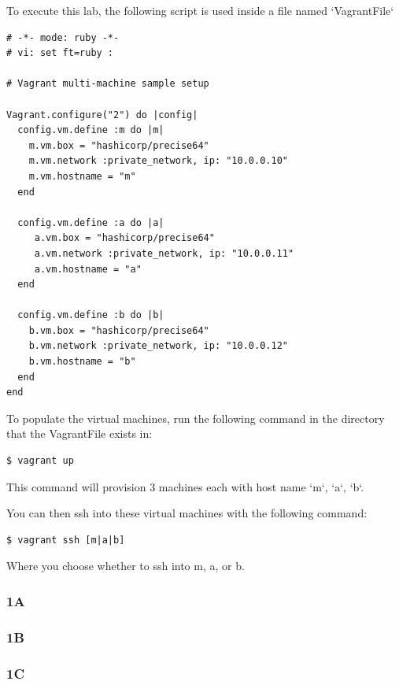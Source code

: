 \documentclass[12pt]{article}
\begin{document}
To execute this lab, the following script is used inside a file named `VagrantFile`
\begin{verbatim}
# -*- mode: ruby -*-
# vi: set ft=ruby :

# Vagrant multi-machine sample setup

Vagrant.configure("2") do |config|
  config.vm.define :m do |m|
    m.vm.box = "hashicorp/precise64"
    m.vm.network :private_network, ip: "10.0.0.10"
    m.vm.hostname = "m"
  end

  config.vm.define :a do |a|
     a.vm.box = "hashicorp/precise64"
     a.vm.network :private_network, ip: "10.0.0.11"
     a.vm.hostname = "a"
  end

  config.vm.define :b do |b|
    b.vm.box = "hashicorp/precise64"
    b.vm.network :private_network, ip: "10.0.0.12"
    b.vm.hostname = "b"
  end
end
\end{verbatim}

To populate the virtual machines, run the following command in the directory that the VagrantFile exists in:

\begin{verbatim}
$ vagrant up
\end{verbatim}
This command will provision 3 machines each with host name `m`, `a`, `b`.

You can then ssh into these virtual machines with the following command:
\begin{verbatim}
$ vagrant ssh [m|a|b]
\end{verbatim}
Where you choose whether to ssh into m, a, or b.


\subsubsection{1A}





\subsubsection{1B}
\subsubsection{1C}
\end{document}
